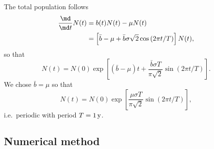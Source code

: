 \documentclass{jpmarticle}
\begin{document}
The total population follows
\begin{equation}
  \begin{split}
    \frac{\md}{\md t} N(t)
    &= b(t) N(t) - \mu N(t)
    \\
    &= \left[
      \bar{b} - \mu
      + \bar{b} \sigma \sqrt{2} \cos\left(2 \pi t / T\right)
    \right]
    N(t),
  \end{split}
\end{equation}
so that
\begin{equation}
  N(t) = N(0) \exp\left[
    \left(\bar{b} - \mu\right) t
    + \frac{\bar{b} \sigma T}{\pi \sqrt{2}}
    \sin\left(2 \pi t / T\right)
  \right].
\end{equation}
We chose $\bar{b} = \mu$ so that
\begin{equation}
  N(t) = N(0) \exp\left[
    \frac{\mu \sigma T}{\pi \sqrt{2}}
    \sin\left(2 \pi t / T\right)
  \right],
\end{equation}
i.e.~periodic with period $T = \unit[1]{y}$.


\subsection{Numerical method}
\end{document}
